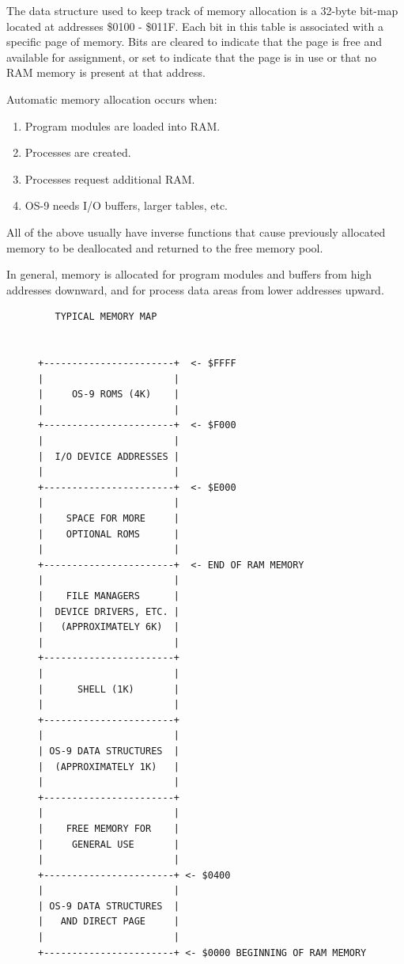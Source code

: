 \documentclass[
]{article}
\begin{document}
The data structure used to keep track of memory allocation is a 32-byte
bit-map located at addresses \$0100 - \$011F. Each bit in this table is
associated with a specific page of memory. Bits are cleared to indicate
that the page is free and available for assignment, or set to indicate
that the page is in use or that no RAM memory is present at that
address.

Automatic memory allocation occurs when:

\begin{enumerate}
\def\labelenumi{\arabic{enumi}.}
\item
  Program modules are loaded into RAM.
\item
  Processes are created.
\item
  Processes request additional RAM.
\item
  OS-9 needs I/O buffers, larger tables, etc.
\end{enumerate}

All of the above usually have inverse functions that cause previously
allocated memory to be deallocated and returned to the free memory pool.

In general, memory is allocated for program modules and buffers from
high addresses downward, and for process data areas from lower addresses
upward.

\begin{figure}
\centering
\begin{verbatim}
   TYPICAL MEMORY MAP


+-----------------------+  <- $FFFF
|                       |
|     OS-9 ROMS (4K)    |
|                       |
+-----------------------+  <- $F000
|                       | 
|  I/O DEVICE ADDRESSES |
|                       | 
+-----------------------+  <- $E000
|                       | 
|    SPACE FOR MORE     |
|    OPTIONAL ROMS      |
|                       | 
+-----------------------+  <- END OF RAM MEMORY
|                       | 
|    FILE MANAGERS      |
|  DEVICE DRIVERS, ETC. |
|   (APPROXIMATELY 6K)  |
|                       |
+-----------------------+
|                       |
|      SHELL (1K)       |
|                       |
+-----------------------+
|                       |
| OS-9 DATA STRUCTURES  |
|  (APPROXIMATELY 1K)   |
|                       |
+-----------------------+
|                       |
|    FREE MEMORY FOR    |
|     GENERAL USE       |
|                       |
+-----------------------+ <- $0400
|                       |
| OS-9 DATA STRUCTURES  |
|   AND DIRECT PAGE     |
|                       |
+-----------------------+ <- $0000 BEGINNING OF RAM MEMORY
\end{verbatim}
\caption{}
\end{figure}
\end{document}
